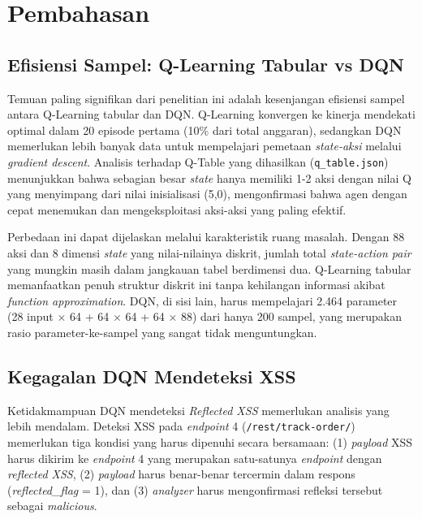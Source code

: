 \section{Pembahasan}

\subsection{Efisiensi Sampel: Q-Learning Tabular vs DQN}

Temuan paling signifikan dari penelitian ini adalah kesenjangan efisiensi sampel antara Q-Learning tabular dan DQN. Q-Learning konvergen ke kinerja mendekati optimal dalam 20 episode pertama (10\% dari total anggaran), sedangkan DQN memerlukan lebih banyak data untuk mempelajari pemetaan \textit{state-aksi} melalui \textit{gradient descent}. Analisis terhadap Q-Table yang dihasilkan (\texttt{q\_table.json}) menunjukkan bahwa sebagian besar \textit{state} hanya memiliki 1-2 aksi dengan nilai Q yang menyimpang dari nilai inisialisasi (5,0), mengonfirmasi bahwa agen dengan cepat menemukan dan mengeksploitasi aksi-aksi yang paling efektif.

Perbedaan ini dapat dijelaskan melalui karakteristik ruang masalah. Dengan 88 aksi dan 8 dimensi \textit{state} yang nilai-nilainya diskrit, jumlah total \textit{state-action pair} yang mungkin masih dalam jangkauan tabel berdimensi dua. Q-Learning tabular memanfaatkan penuh struktur diskrit ini tanpa kehilangan informasi akibat \textit{function approximation}. DQN, di sisi lain, harus mempelajari 2.464 parameter (28 input $\times$ 64 + 64 $\times$ 64 + 64 $\times$ 88) dari hanya 200 sampel, yang merupakan rasio parameter-ke-sampel yang sangat tidak menguntungkan.

\subsection{Kegagalan DQN Mendeteksi XSS}

Ketidakmampuan DQN mendeteksi \textit{Reflected XSS} memerlukan analisis yang lebih mendalam. Deteksi XSS pada \textit{endpoint} 4 (\texttt{/rest/track-order/}) memerlukan tiga kondisi yang harus dipenuhi secara bersamaan: (1) \textit{payload} XSS harus dikirim ke \textit{endpoint} 4 yang merupakan satu-satunya \textit{endpoint} dengan \textit{reflected XSS}, (2) \textit{payload} harus benar-benar tercermin dalam respons (\textit{reflected\_flag} = 1), dan (3) \textit{analyzer} harus mengonfirmasi refleksi tersebut sebagai \textit{malicious}.

